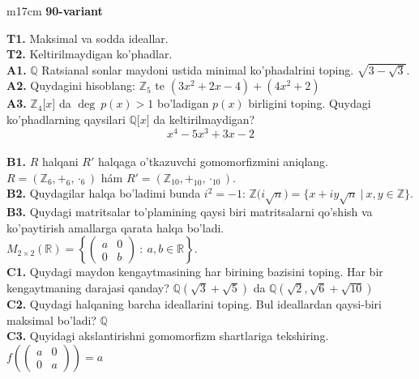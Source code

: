 \documentclass{article}
\begin{document}
\begin{tabular}{m{17cm}}
\textbf{90-variant}
\newline

\textbf{T1.} Maksimal va sodda ideallar. \\
\textbf{T2.} Keltirilmaydigan ko'phadlar. \\
\textbf{A1.} \(\mathbb{Q}\) Ratsianal sonlar maydoni ustida minimal ko'phadalrini toping.
\(\sqrt{3 - \sqrt{3}}\). \\
\textbf{A2.} Quydagini hisoblang:
\(\mathbb{Z}_{5}\) te \(\left( 3x^{2} + 2x - 4 \right) + \left( 4x^{2} + 2 \right)\) \\
\textbf{A3.} \(\mathbb{Z}_{4}\lbrack x\rbrack\) da \(\deg\ p(x) > 1\) bo'ladigan \(p(x)\) birligini toping. Quydagi ko'phadlarning qaysilari \(\mathbb{Q\lbrack}x\rbrack\) da keltirilmaydigan?
\[x^{4} - 5x^{3} + 3x - 2\] \\
\textbf{B1.} \(R\) halqani \(R'\) halqaga o'tkazuvchi gomomorfizmini aniqlang.
\(R = (\mathbb{Z}_{6}, +_{6}, \cdot_{6})\) hám \(R' = (\mathbb{Z}_{10}, +_{10}, \cdot_{10})\). \\
\textbf{B2.} Quydagilar halqa bo'ladimi bunda \(i^{2} = - 1\):
\(\mathbb{Z(}i\sqrt{n}) = \{ x + iy\sqrt{n}\ |\ x,y \in \mathbb{Z\}}\). \\
\textbf{B3.} Quydagi matritsalar to'plamining qaysi biri matritsalarni qo'shish va ko'paytirish amallarga qarata halqa bo'ladi.
\(M_{2 \times 2}\mathbb{(R) =}\left\{ \begin{pmatrix}
a & 0 \\
0 & b
\end{pmatrix}\ :\ a,b \in \mathbb{R} \right\}\). \\
\textbf{C1.} Quydagi maydon kengaytmasining har birining bazisini toping. Har bir kengaytmaning darajasi qanday?
\(\mathbb{Q}\left( \sqrt{3} + \sqrt{5} \right)\) da \(\mathbb{Q}\left( \sqrt{2},\sqrt{6} + \sqrt{10} \right)\) \\
\textbf{C2.} Quydagi halqaning barcha ideallarini toping. Bul ideallardan qaysi-biri maksimal bo'ladi? $\mathbb{Q}$ \\
\textbf{C3.} Quyidagi akslantirishni gomomorfizm shartlariga tekshiring. \(f\left( \begin{pmatrix}
a & 0 \\
0 & a
\end{pmatrix} \right) = a\) \\

\end{tabular}
\vspace{1cm}
\end{document}
